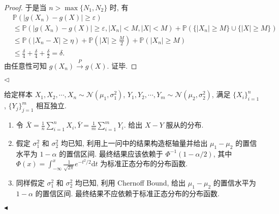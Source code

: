 \documentclass[11pt]{article}
\newenvironment{problem}[2][Problem]{\begin{trivlist}
    \item[\hskip \labelsep {\bfseries #1}\hskip \labelsep {\bfseries #2.}]\songti}{\hfill$\blacktriangleleft$\end{trivlist}}
\newenvironment{answer}[1][Solution]{\begin{trivlist}
    \item[\hskip \labelsep {\bfseries #1.}\hskip \labelsep]}{\hfill$\lhd$\end{trivlist}}
\newcommand\1{\mathds{1}}
\newcommand\PP{\mathbb{P}}
\newcommand\dd{\mathrm{d}}
\newcommand{\arrp}{\xrightarrow{P}}
\begin{document}
\begin{answer}
\begin{proof}
        于是当 $n > \max\{N_1, N_2\}$ 时, 有
        \begin{align*}
            &\PP(|g(X_n) - g(X)| \ge \varepsilon) \\
            &\le \PP\left(|g(X_n) - g(X)| \ge \varepsilon, |X_n| < M, |X| < M\right) + \PP\left(\{|X_n| \ge M\} \cup \{|X| \ge M\}\right) \\
            &\le \PP\left(|X_n - X| \ge \eta\right) + \PP\left(|X| \ge \frac{M}{2}\right) + \PP\left(|X_n| \ge M\right) \\
            &\le \frac{\delta}{4} + \frac{\delta}{4} + \frac{\delta}{2} = \delta.
        \end{align*}
        由任意性可知 $g(X_n) \arrp g(X)$. 证毕.
    \end{proof}
\end{answer}

\begin{problem}{4}
    给定样本 $X_1, X_2, \cdots, X_n \sim \mathcal{N}(\mu_1, \sigma_1^2)$, $Y_1, Y_2, \cdots, Y_m \sim \mathcal{N}(\mu_2, \sigma_2^2)$, 满足 $\{X_i\}_{i=1}^n$, $\{Y_j\}_{j=1}^m$ 相互独立.
    \begin{enumerate}[label = (\arabic*)]
        \item 令 $\bar{X} = \frac{1}{n} \sum_{i=1}^{n}X_i, \bar{Y} = \frac{1}{m} \sum_{i=1}^{m}Y_i$. 给出 $X - Y$ 服从的分布.
        \item 假定 $\sigma_1^2$ 和 $\sigma_2^2$ 均已知, 利用上一问中的结果构造枢轴量并给出 $\mu_1 - \mu_2$ 的置信水平为 $1-\alpha$ 的置信区间.
        最终结果应该依赖于 $\Phi^{-1}(1-\alpha/2)$, 其中 $\Phi(x) = \int_{-\infty}^{x} \frac{1}{\sqrt{2\pi}}e^{-t^2/2}\dd t$ 为标准正态分布的分布函数.
        \item 同样假定 $\sigma_1^2$ 和 $\sigma_2^2$ 均已知, 利用 Chernoff Bound, 给出 $\mu_1 - \mu_2$ 的置信水平为 $1-\alpha$ 的置信区间. 最终结果不应依赖于标准正态分布的分布函数.
    \end{enumerate}
\end{problem}
\end{document}
